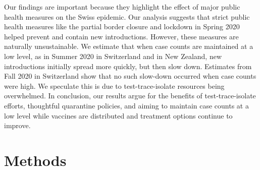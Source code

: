 \documentclass[9pt,twoside,lineno]{pnas-new} %
\begin{document}

Our findings are important because they highlight the effect of major public health measures on the Swiss epidemic. Our analysis suggests that strict public health measures like the partial border closure and lockdown in Spring 2020 helped prevent and contain new introductions. However, these measures are naturally unsustainable. We estimate that when case counts are maintained at a low level, as in Summer 2020 in Switzerland and in New Zealand, new introductions initially spread more quickly, but then slow down. Estimates from Fall 2020 in Switzerland show that no such slow-down occurred when case counts were high. We speculate this is due to test-trace-isolate resources being overwhelmed. In conclusion, our results argue for the benefits of test-trace-isolate efforts, thoughtful quarantine policies, and aiming to maintain case counts at a low level while vaccines are distributed and treatment options continue to improve.

\section{Methods}
\end{document}
